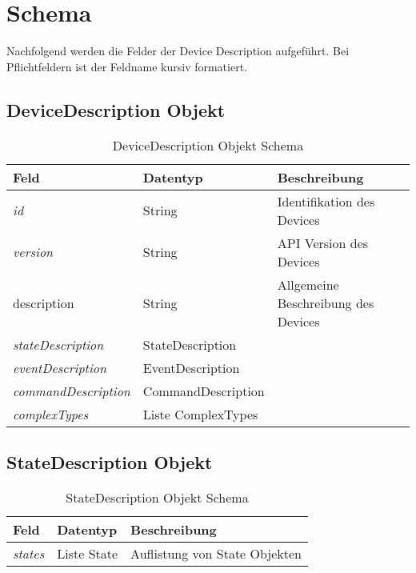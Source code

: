 \section{Schema}

Nachfolgend werden die Felder der Device Description aufgeführt. Bei Pflichtfeldern ist der Feldname kursiv formatiert.

\subsection{DeviceDescription Objekt}

\begin{table}[H]
\begin{tabularx}{\textwidth}{|l|l|X|}

 \hline \rowcolor{lightgray}
 {\bf Feld } & {\bf Datentyp } & {\bf Beschreibung } \\  \hline

 \textit{id}  &   String   & Identifikation des Devices   \\ \hline

 \textit{version} & String & API Version des Devices \\ \hline

 description & String & Allgemeine Beschreibung des Devices \\ \hline 
 
 \textit{stateDescription}  &   StateDescription    &     \\ \hline
 
 \textit{eventDescription}  &   EventDescription    &     \\ \hline
  
 \textit{commandDescription}  &   CommandDescription    &     \\ \hline
 
 \textit{complexTypes}  &   Liste ComplexTypes    &     \\ \hline
 
\end{tabularx}
\caption{DeviceDescription Objekt Schema}
\end{table}

\subsection{StateDescription Objekt}
\begin{table}[H]
\begin{tabularx}{\textwidth}{|l|l|X|}

 \hline \rowcolor{lightgray}
 {\bf Feld } & {\bf Datentyp } & {\bf Beschreibung } \\  \hline

 \textit{states}  &   Liste State   & Auflistung von State Objekten   \\ \hline

\end{tabularx}
\caption{StateDescription Objekt Schema}
\end{table}

